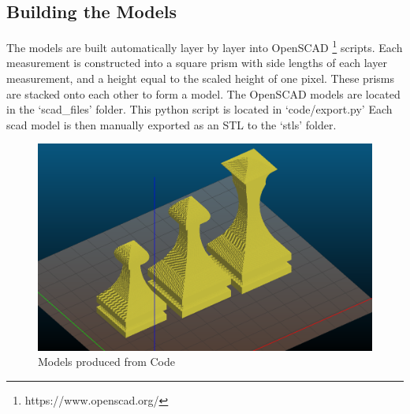 \documentclass{IEEEtran}
\begin{document}
        \subsection{Building the Models}
            The models are built automatically layer by layer into OpenSCAD \footnote{https://www.openscad.org/} scripts.  Each measurement is constructed into a square prism with
            side lengths of each layer measurement, and a height equal to the scaled height of one pixel.  These prisms are stacked onto each other to form a model.  The OpenSCAD models are
            located in the `scad\_files' folder.  This python script is located in `code/export.py'  Each scad model is then manually exported as an STL to the `stls' folder.
            \begin{figure}
                \includegraphics{../stls/stls.png}
                \caption{Models produced from Code}
            \end{figure}
\end{document}
